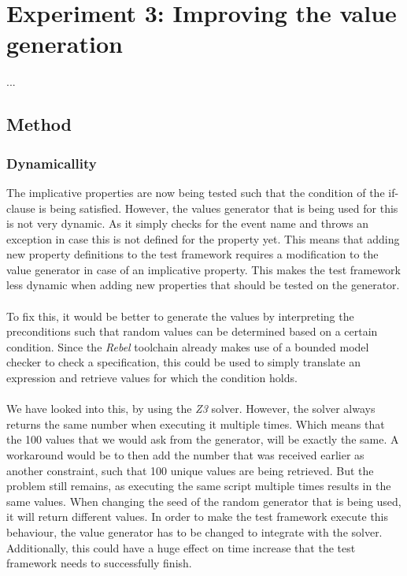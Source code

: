 \chapter{Experiment 3: Improving the value generation}
\label{cpt:experiment3}
...

\section{Method}

\subsection*{Dynamicallity}
The implicative properties are now being tested such that the condition of the
if-clause is being satisfied. However, the values generator that is being used
for this is not very dynamic. As it simply checks for the event name and throws
an exception in case this is not defined for the property yet. This means that
adding new property definitions to the test framework requires a modification to
the value generator in case of an implicative property. This makes the test
framework less dynamic when adding new properties that should be tested on the
generator.\\
\\
To fix this, it would be better to generate the values by interpreting the
preconditions such that random values can be determined based on a certain
condition. Since the \textit{Rebel} toolchain already makes use of a bounded
model checker to check a specification, this could be used to simply translate
an expression and retrieve values for which the condition holds.\\
\\
We have looked into this, by using the \textit{Z3} solver. However, the solver
always returns the same number when executing it multiple times. Which means
that the 100 values that we would ask from the generator, will be exactly the
same. A workaround would be to then add the number that was received earlier as
another constraint, such that 100 unique values are being retrieved. But the
problem still remains, as executing the same script multiple times results in
the same values. When changing the seed of the random generator that is being
used, it will return different values. In order to make the test framework
execute this behaviour, the value generator has to be changed to integrate with
the solver. Additionally, this could have a huge effect on time increase that
the test framework needs to successfully finish.\\
\\






